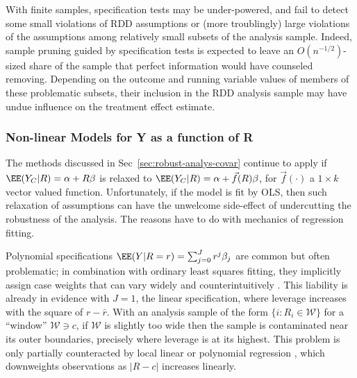 With finite samples, specification tests may be under-powered, and
fail to detect some small violations of RDD assumptions or (more
troublingly) large violations of the assumptions among relatively
small subsets of the analysis sample.
Indeed, sample pruning guided by specification tests is expected to
leave an $O(n^{-1/2})$-sized share of the sample that perfect
information would have counseled removing.
Depending on the outcome and running variable values of members of
these problematic subsets, their inclusion in the RDD analysis sample
may have undue influence on the treatment effect estimate.

\subsubsection{Non-linear Models for Y as a function of R}
The methods discussed in Sec~\ref{sec:robust-analys-covar} continue to
apply if $\EE (Y_{C}| R) = \alpha + R\beta$ is relaxed to
$\EE (Y_{C}| R) = \alpha + \vec{f}(R)\beta$, for
$\vec{f}(\cdot)$ a $1 \times k$ vector valued function.
Unfortunately, if the model is fit by OLS, then such relaxation of assumptions can have the unwelcome
side-effect of undercutting the robustness of the analysis.  The
reasons have to do with mechanics of regression fitting.

Polynomial specifications
$\EE(Y | R=r) = \sum_{j=0}^{J} r^{j} \beta_{j}$ are common but often
problematic; in combination with ordinary least squares fitting, they
implicitly assign case weights that can vary widely and
counterintuitively \citep{gelman2016high}.
This liability is already
in evidence with $J=1$, the linear specification, where leverage
increases with the square of $r -\bar{r}$.  With an analysis sample
of the form $\{i : R_{i} \in \mathcal{W}\}$ for a ``window''
$\mathcal{W} \ni c$, if $\mathcal{W}$ is slightly too wide then the
sample is contaminated near its outer boundaries, precisely
where leverage is at its highest.
This problem is only partially counteracted by local linear or polynomial regression
\citep[e.g.][]{imbens2012optimal,cct},
which downweights observations as $|R-c|$ increases linearly.


